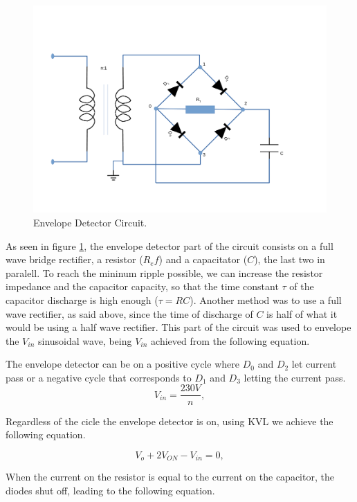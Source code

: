 \begin{figure}[!ht] \centering
\includegraphics[width=0.8\linewidth]{envelopedetector.pdf} %
\squeezeup 
\caption{Envelope Detector Circuit.}
\label{fig:envelope}
\end{figure}

As seen in figure \ref{fig:envelope}, the envelope detector part of the circuit consists on a full wave bridge rectifier, a resistor ($R_ef$) and a capacitator ($C$), the last two in paralell. To reach the mininum ripple possible, we can increase the resistor impedance and the capacitor capacity, so that the time constant $\tau$ of the capacitor discharge is high enough ($\tau=RC$). Another method was to use a full wave rectifier, as said above, since the time of discharge of $C$ is half of what it would be using a half wave rectifier. This part of the circuit was used to envelope the $V_{in}$ sinusoidal wave, being $V_{in}$ achieved from the following equation.

The envelope detector can be on a positive cycle where $D_0$ and $D_2$ let current pass or a negative cycle that corresponds to $D_1$ and $D_3$ letting the current pass.
\begin{equation}
  V_{in} = \frac{230V}{n},
  \label{eq:vin}
\end{equation}
 
Regardless of the cicle the envelope detector is on, using KVL we achieve the following equation.

\begin{equation}
    V_o + 2V_{ON} - V_{in} = 0,
 \label{eq:envelope2}  
\end{equation}

When the current on the resistor is equal to the current on the capacitor, the diodes shut off, leading to the following equation.

